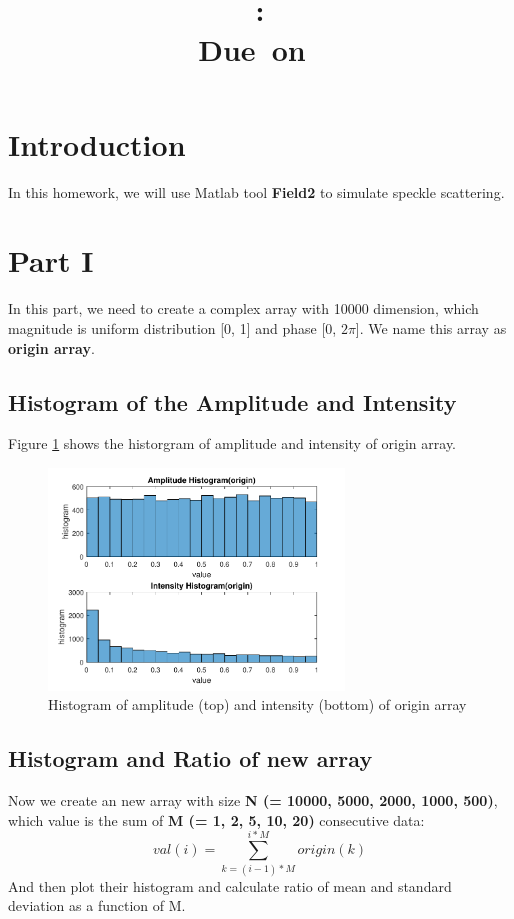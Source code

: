 \documentclass{article}
\title{
    \vspace{2in}
    \textmd{\textbf{\hmwkClass}}\\
    \textmd{\textbf{\hmwkID: \hmwkTitle}} \\
    \normalsize\vspace{0.1in}\small{Due\ on\ \hmwkDueDate}\\
    \vspace{3in}
}
\author{\textbf{\hmwkAuthorName}}
\date{} %
\begin{document}
\maketitle
\newpage

\renewcommand\thesubsection{\thesection.\alph{subsection}}

\section{Introduction}
In this homework, we will use Matlab tool \textbf{Field2} to simulate speckle scattering.

\section{Part \RN{1}}
In this part, we need to create a complex array with 10000 dimension, which magnitude is uniform distribution [0, 1] and phase [0, $2\pi$].
We name this array as \textbf{origin array}.

\subsection{Histogram of the Amplitude and Intensity}
Figure \ref{fig:hist-origin} shows the historgram of amplitude and intensity of origin array.
\begin{figure}[H]
	\centering
	\includegraphics[width = 0.7\textwidth]{src/2pi/hist_origin.pdf}
	\caption{Histogram of amplitude (top) and intensity (bottom) of origin array}
	\label{fig:hist-origin}
\end{figure}

\subsection{Histogram and Ratio of new array}
Now we create an new array with size \textbf{N (= 10000, 5000, 2000, 1000, 500)}, which value is the sum of \textbf{M (= 1, 2, 5, 10, 20)} consecutive data:
$$
	val(i) = \sum_{k = (i-1)*M}^{i*M}{origin(k)}
$$ 
And then plot their histogram and calculate ratio of mean and standard deviation as a function of M. 
\end{document}
